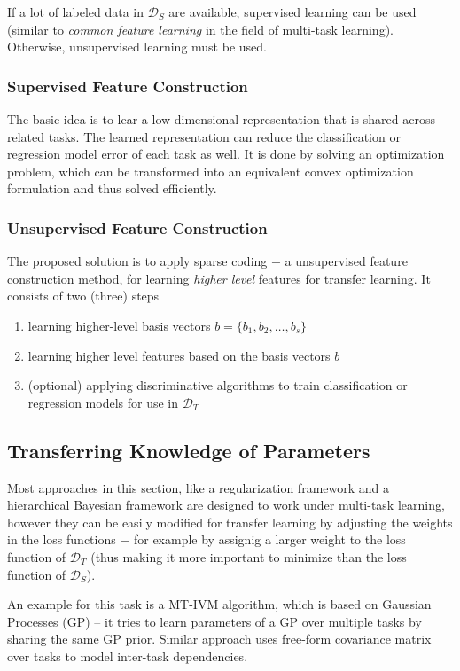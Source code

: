 \documentclass[a4paper,twocolumn]{article}
\newcommand{\D}{\mathcal{D}}
\begin{document}
If a lot of labeled data in $\D_S$ are available, supervised learning can be used (similar to \textit{common feature learning} in the field of multi-task learning).
Otherwise, unsupervised learning must be used.

\subsubsection{Supervised Feature Construction}
The basic idea is to lear a low-dimensional representation that is shared across related tasks. The learned representation can reduce the classification or regression model error of each task as well. It is done by solving an optimization problem, which can be transformed into an equivalent convex optimization formulation and thus solved efficiently.
\subsubsection{Unsupervised Feature Construction}
The proposed solution is to apply sparse coding $-$ a unsupervised feature construction method, for learning \textit{higher level} features for transfer learning.
It consists of two (three) steps
\begin{enumerate}
    \item learning higher-level basis vectors $b = \{b_1, b_2, \ldots, b_s\}$
    \item learning higher level features based on the basis vectors $b$
    \item (optional) applying discriminative algorithms to train classification or regression models for use in $\D_T$
\end{enumerate}
\subsection{Transferring Knowledge of Parameters}
Most approaches in this section, like a regularization framework and a hierarchical Bayesian framework are designed to work under multi-task learning, however they can be easily modified for transfer learning by adjusting the weights in the loss functions $-$ for example by assignig a larger weight to the loss function of $\D_T$ (thus making it more important to minimize than the loss function of $\D_S$).

An example for this task is a MT-IVM algorithm, which is based on Gaussian Processes (GP) – it tries to learn parameters of a GP over multiple tasks by sharing the same GP prior.
Similar approach uses free-form covariance matrix over tasks to model inter-task dependencies.
\end{document}
